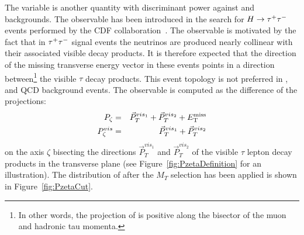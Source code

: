 The \Pzeta variable is another quantity with discriminant power against \WpJets
and \ttbar backgrounds.  The observable has been introduced in the search for
$H\to\tau^+\tau^-$ events performed by the CDF collaboration~\cite{CDFrefPzeta}.  The
observable is motivated by the fact that in $\tau^+\tau^-$ signal events the neutrinos
are produced nearly collinear with their associated visible decay products. It
is therefore expected that the direction of the missing transverse energy vector
in these events points in a direction between\footnote{In other words, the
projection of \VMET is positive along the bisector of the muon and hadronic tau
momenta.} the visible
$\tau$ decay products. This event topology is not preferred in \WpJets, 
\ttbar and QCD background events.  The observable is computed as the
difference of the projections:
\begin{eqnarray}
P_{\zeta} &=& \vec{P}_{T}^{vis_{1}} + \vec{P}_{T}^{vis_{2}} + E_{\mathrm{T}}^{\text{miss}} \nonumber \\
P_{\zeta}^{vis} &=& \vec{P}_{T}^{vis_{1}} + \vec{P}_{T}^{vis_{2}} \nonumber
\label{eq:PZetaEq}
\end{eqnarray}
on the axis $\zeta$ bisecting the directions $\vec{P}_{T}^{vis_{1}}$ and
$\vec{P}_{T}^{vis_{2}}$ of the visible $\tau$ lepton decay products in the
transverse plane (see Figure~\ref{fig:PzetaDefinition} for an illustration).
The distribution of \Pzeta after the $M_T$ selection has been applied is shown
in Figure~\ref{fig:PzetaCut}.
